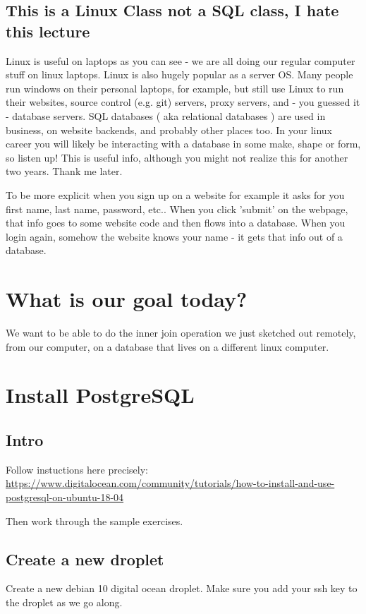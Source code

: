 \documentclass[12pt]{article}
\begin{document}
\subsection{This is a Linux Class not a SQL class, I hate this lecture}
Linux is useful on laptops as you can see - we are all doing our regular computer stuff on linux laptops. Linux is also hugely popular as a server OS. Many people run windows on their personal laptops, for example, but still use Linux to run their websites, source control (e.g. git) servers, proxy servers, and - you guessed it - database servers. SQL databases ( aka relational databases ) are used in business, on website backends, and probably other places too. In your linux career you will likely be interacting with a database in some make, shape or form, so listen up! This is useful info, although you might not realize this for another two years. Thank me later.


To be more explicit when you sign up on a website for example it asks for you first name, last name, password, etc.. When you click 'submit' on the webpage, that info goes to some website code and then flows into a database. When you login again, somehow the website knows your name - it gets that info out of a database. 

\section{What is our goal today?}
We want to be able to do the inner join operation we just sketched out remotely, from our computer, on a database that lives on a different linux computer.

\section{Install PostgreSQL}

\subsection{Intro}
Follow instuctions here precisely:
\url{https://www.digitalocean.com/community/tutorials/how-to-install-and-use-postgresql-on-ubuntu-18-04}

Then work through the sample exercises.

\subsection{Create a new droplet}
Create a new debian 10 digital ocean droplet. Make sure you add your ssh key to the droplet as we go along.
\end{document}
